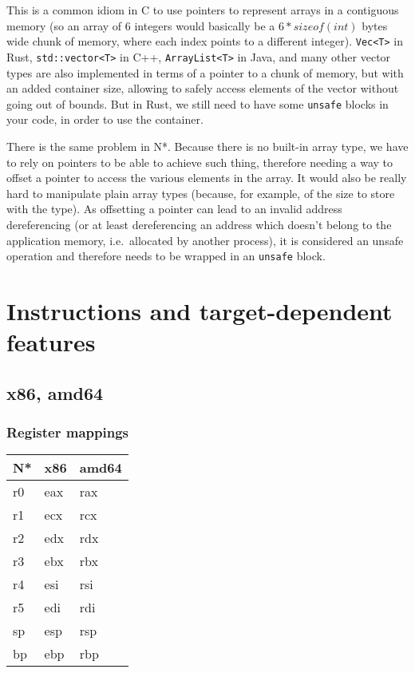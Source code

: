 This is a common idiom in C to use pointers to represent arrays in a contiguous memory (so an array of 6 integers would basically be a $6 * sizeof(int)$ bytes wide chunk of memory, where each index points to a different integer).
\texttt{Vec<T>} in Rust, \texttt{std::vector<T>} in C++, \texttt{ArrayList<T>} in Java, and many other vector types are also implemented in terms of a pointer to a chunk of memory, but with an added container size, allowing to safely access elements of the vector without going out of bounds.
But in Rust, we still need to have some \texttt{unsafe} blocks in your code, in order to use the container.

There is the same problem in N*.
Because there is no built-in array type, we have to rely on pointers to be able to achieve such thing, therefore needing a way to offset a pointer to access the various elements in the array.
It would also be really hard to manipulate plain array types (because, for example, of the size to store with the type).
As offsetting a pointer can lead to an invalid address dereferencing (or at least dereferencing an address which doesn't belong to the application memory, i.e.\ allocated by another process), it is considered an unsafe operation and therefore needs to be wrapped in an \texttt{unsafe} block.

\chapter{Instructions and target-dependent features}\label{chap:nstar-specific}

\section{x86, amd64}\label{sec:nstar-specific-x86amd64}

\subsection{Register mappings}\label{subsec:nstar-specific-x86amd64-registers}

\begin{tabularx}{\textwidth}{Y Y Y}
  \toprule
  N* & x86 & amd64 \\
  \midrule
  r0 & eax & rax \\
  r1 & ecx & rcx \\
  r2 & edx & rdx \\
  r3 & ebx & rbx \\
  r4 & esi & rsi \\
  r5 & edi & rdi \\
  \midrule
  sp & esp & rsp \\
  bp & ebp & rbp \\
  \bottomrule
\end{tabularx}

